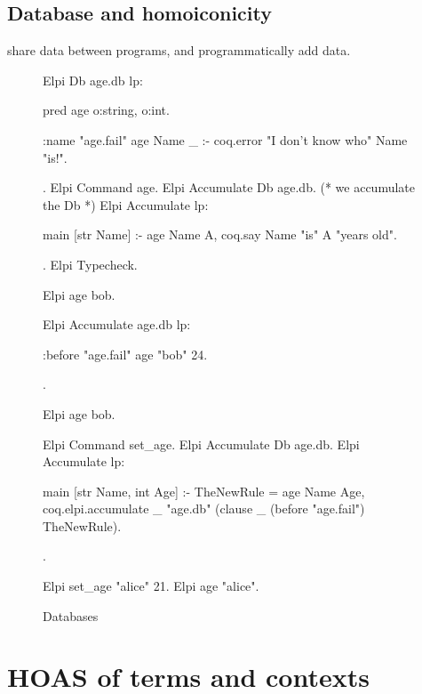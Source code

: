 \documentclass[a4paper, 11pt]{book}
\begin{document}
\subsection{Database and homoiconicity}

share data between programs, and programmatically add data.

\begin{figure}
  \begin{coqcode}


    Elpi Db age.db lp:{{

    pred age o:string, o:int.
  
    :name "age.fail"
    age Name _ :- coq.error "I don't know who" Name "is!".
  
  }}.
  Elpi Command age. 
  Elpi Accumulate Db age.db.  (* we accumulate the Db *)
  Elpi Accumulate lp:{{
  
    main [str Name] :-
      age Name A,
      coq.say Name "is" A "years old".
  
  }}.
  Elpi Typecheck. 
  
  Elpi age bob.
    
  Elpi Accumulate age.db lp:{{
  
    :before "age.fail"     %
    age "bob" 24.
  
  }}.
  
  Elpi age bob.
  
  
  Elpi Command set_age.
  Elpi Accumulate Db age.db.
  Elpi Accumulate lp:{{
    main [str Name, int Age] :-
      TheNewRule = age Name Age,
      coq.elpi.accumulate _ "age.db"
        (clause _ (before "age.fail") TheNewRule).

  }}.
  
  Elpi set_age "alice" 21. 
  Elpi age "alice".
  \end{coqcode}
  \caption[Databases]{Databases\label{databases}}
  \end{figure}

  
\section{HOAS of terms and contexts}
\end{document}
